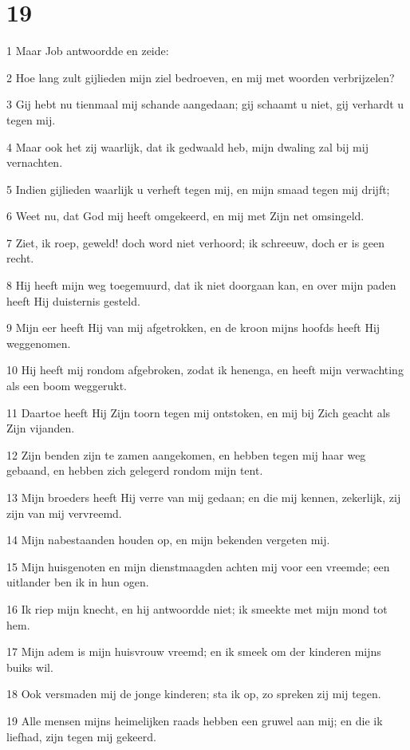 \chapter{19}

\par 1 Maar Job antwoordde en zeide:
\par 2 Hoe lang zult gijlieden mijn ziel bedroeven, en mij met woorden verbrijzelen?
\par 3 Gij hebt nu tienmaal mij schande aangedaan; gij schaamt u niet, gij verhardt u tegen mij.
\par 4 Maar ook het zij waarlijk, dat ik gedwaald heb, mijn dwaling zal bij mij vernachten.
\par 5 Indien gijlieden waarlijk u verheft tegen mij, en mijn smaad tegen mij drijft;
\par 6 Weet nu, dat God mij heeft omgekeerd, en mij met Zijn net omsingeld.
\par 7 Ziet, ik roep, geweld! doch word niet verhoord; ik schreeuw, doch er is geen recht.
\par 8 Hij heeft mijn weg toegemuurd, dat ik niet doorgaan kan, en over mijn paden heeft Hij duisternis gesteld.
\par 9 Mijn eer heeft Hij van mij afgetrokken, en de kroon mijns hoofds heeft Hij weggenomen.
\par 10 Hij heeft mij rondom afgebroken, zodat ik henenga, en heeft mijn verwachting als een boom weggerukt.
\par 11 Daartoe heeft Hij Zijn toorn tegen mij ontstoken, en mij bij Zich geacht als Zijn vijanden.
\par 12 Zijn benden zijn te zamen aangekomen, en hebben tegen mij haar weg gebaand, en hebben zich gelegerd rondom mijn tent.
\par 13 Mijn broeders heeft Hij verre van mij gedaan; en die mij kennen, zekerlijk, zij zijn van mij vervreemd.
\par 14 Mijn nabestaanden houden op, en mijn bekenden vergeten mij.
\par 15 Mijn huisgenoten en mijn dienstmaagden achten mij voor een vreemde; een uitlander ben ik in hun ogen.
\par 16 Ik riep mijn knecht, en hij antwoordde niet; ik smeekte met mijn mond tot hem.
\par 17 Mijn adem is mijn huisvrouw vreemd; en ik smeek om der kinderen mijns buiks wil.
\par 18 Ook versmaden mij de jonge kinderen; sta ik op, zo spreken zij mij tegen.
\par 19 Alle mensen mijns heimelijken raads hebben een gruwel aan mij; en die ik liefhad, zijn tegen mij gekeerd.
